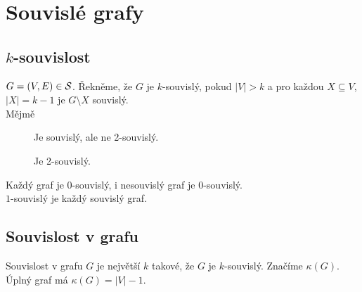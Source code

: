 \section{Souvislé grafy}

\subsection{\texorpdfstring{$k$}{k}-souvislost}
$G = (V,E) \in \S$. Řekněme, že $G$ je $k$-souvislý, pokud $|V| > k$ a pro každou $X \subseteq V$, $|X| = k-1$ je 
$G \setminus X$ souvislý.\\
Mějmě
\begin{figure}[H]
    \centering
    \begin{minipage}[c]{0.3\textwidth}
        \begin{figure}[H]
        \end{figure}
        Je souvislý, ale ne 2-souvislý.
    \end{minipage}%
    \hspace{0.1\textwidth}
    \begin{minipage}[c]{0.3\textwidth}
        \begin{figure}[H]
        \end{figure}
        Je 2-souvislý.
    \end{minipage}
\end{figure}
Každý graf je $0$-souvislý, i nesouvislý graf je $0$-souvislý.\\
$1$-souvislý je každý souvislý graf.

\subsection{Souvislost v grafu}
Souvislost v grafu $G$ je největší $k$ takové, že $G$ je $k$-souvislý. Značíme $\kappa(G)$. \\ Úplný graf má 
$\kappa(G) = |V|-1$.

